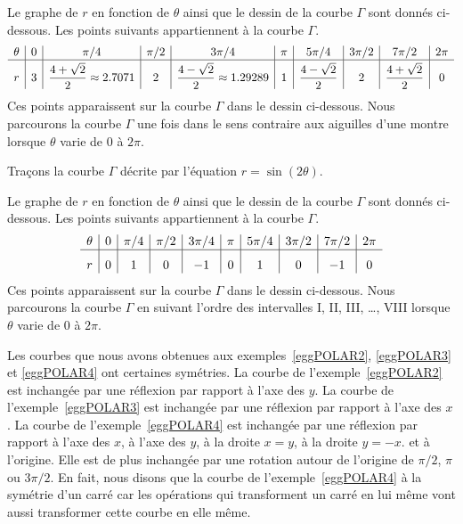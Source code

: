 {\begin{egg}
Le graphe de $r$ en fonction de $\theta$ ainsi que le dessin de la
courbe $\Gamma$ sont donnés ci-dessous.  Les points suivants
appartiennent à la courbe $\Gamma$.
\[
\begin{array}{*{9}{c|}c}
\theta & 0 & \pi/4 & \pi/2 & 3\pi/4 & \pi & 5\pi/4 & 3\pi/2 & 7\pi/2 &
2\pi \\
\hline
\rule{0pt}{1.8em} r & 3 &
\displaystyle \frac{4+\sqrt{2}}{2} \approx 2.7071 & 2 &
\displaystyle \frac{4-\sqrt{2}}{2} \approx 1.29289
& 1 & \displaystyle \frac{4-\sqrt{2}}{2} & 2 &
\displaystyle \frac{4+\sqrt{2}}{2} & 0
\end{array}
\]
Ces points apparaissent sur la courbe $\Gamma$ dans le dessin
ci-dessous.  Nous parcourons la courbe $\Gamma$ une fois dans le sens
contraire aux aiguilles d'une montre lorsque $\theta$ varie de $0$ à
$2\pi$.
\label{eggPOLAR3}
\end{egg}

\begin{egg}
Traçons la courbe $\Gamma$ décrite par l'équation
$r = \sin(2\theta)$.

Le graphe de $r$ en fonction de $\theta$ ainsi que le dessin de la
courbe $\Gamma$ sont donnés ci-dessous.  Les points suivants
appartiennent à la courbe $\Gamma$.
\[
\begin{array}{*{9}{c|}c}
\theta & 0 & \pi/4 & \pi/2 & 3\pi/4 & \pi & 5\pi/4 & 3\pi/2 & 7\pi/2 &
2\pi \\
\hline
\rule{0pt}{1.5em} r & 0 & 1 & 0 & -1 & 0 & 1 & 0 & -1 & 0
\end{array}
\]
Ces points apparaissent sur la courbe $\Gamma$ dans le dessin
ci-dessous.  Nous parcourons la courbe $\Gamma$ en suivant l'ordre des
intervalles I, II, III, \ldots, VIII lorsque $\theta$ varie de $0$ à
$2\pi$.
\label{eggPOLAR4}
\end{egg}

\begin{rmk}
Les courbes que nous avons obtenues aux exemples~\ref{eggPOLAR2},
\ref{eggPOLAR3} et \ref{eggPOLAR4} ont certaines symétries.  La courbe
de l'exemple~\ref{eggPOLAR2} est inchangée par une réflexion par
rapport à l'axe des $y$.  La courbe de l'exemple~\ref{eggPOLAR3} est
inchangée par une réflexion par rapport à l'axe des $x$.  La courbe de
l'exemple~\ref{eggPOLAR4} est inchangée par une réflexion par rapport
à l'axe des $x$, à l'axe des $y$, à la droite $x=y$, à la droite
$y=-x$. et à l'origine.  Elle est de plus inchangée par une rotation
autour de l'origine de $\pi/2$, $\pi$ ou $3\pi/2$.  En fait, nous
disons que la courbe de l'exemple~\ref{eggPOLAR4} à la symétrie d'un
carré car les opérations qui transforment un carré en lui même vont aussi
transformer cette courbe en elle même.


\end{rmk}}
